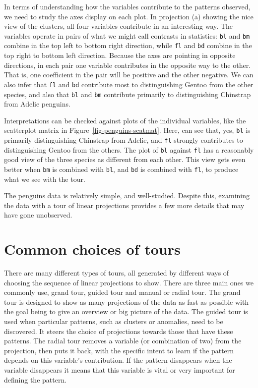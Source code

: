 \documentclass[
  letterpaper,
]{krantz}
\begin{document}
In terms of understanding how the variables contribute to the patterns
observed, we need to study the axes display on each plot. In projection
(a) showing the nice view of the clusters, all four variables contribute
in an interesting way. The variables operate in pairs of what we might
call contrasts in statistics: \texttt{bl} and \texttt{bm} combine in the
top left to bottom right direction, while \texttt{fl} and \texttt{bd}
combine in the top right to bottom left direction. Because the axes are
pointing in opposite directions, in each pair one variable contributes
in the opposite way to the other. That is, one coefficient in the pair
will be positive and the other negative. We can also infer that
\texttt{fl} and \texttt{bd} contribute most to distinguishing Gentoo
from the other species, and also that \texttt{bl} and \texttt{bm}
contribute primarily to distinguishing Chinstrap from Adelie penguins.

Interpretations can be checked against plots of the individual
variables, like the scatterplot matrix in
Figure~\ref{fig-penguins-scatmat}. Here, can see that, yes, \texttt{bl}
is primarily distinguishing Chinstrap from Adelie, and \texttt{fl}
strongly contributes to distinguishing Gentoo from the others. The plot
of \texttt{bl} against \texttt{fl} has a reasonably good view of the
three species as different from each other. This view gets even better
when \texttt{bm} is combined with \texttt{bl}, and \texttt{bd} is
combined with \texttt{fl}, to produce what we see with the tour.

The penguins data is relatively simple, and well-studied. Despite this,
examining the data with a tour of linear projections provides a few more
details that may have gone unobserved.

\section{Common choices of tours}\label{common-choices-of-tours}

There are many different types of tours, all generated by different ways
of choosing the sequence of linear projections to show. There are three
main ones we commonly use, grand tour, guided tour and manual or radial
tour. The grand tour is designed to show as many projections of the data
as fast as possible with the goal being to give an overview or big
picture of the data. The guided tour is used when particular patterns,
such as clusters or anomalies, need to be discovered. It steers the
choice of projections towards those that have these patterns. The radial
tour removes a variable (or combination of two) from the projection,
then puts it back, with the specific intent to learn if the pattern
depends on this variable's contribution. If the pattern disappears when
the variable disappears it means that this variable is vital or very
important for defining the pattern.
\end{document}
